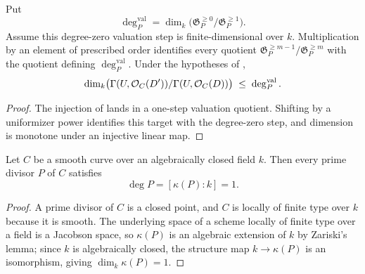 \begin{theorem}
  \label{thm:adelic_local_step_dim_le_residue_degree}
  \leanok
  Put
  \[
    \deg_P^{\mathrm{val}}
      =\dim_k\bigl(\mathfrak G_P^{\ge0}/\mathfrak G_P^{\ge1}\bigr).
  \]
  Assume this degree-zero valuation step is finite-dimensional over \(k\).
  Multiplication by an element of prescribed order identifies every
  quotient \(\mathfrak G_P^{\ge m-1}/\mathfrak G_P^{\ge m}\) with the
  quotient defining \(\deg_P^{\mathrm{val}}\).  Under the hypotheses of
  ,
  \[
    \dim_k \bigl(\Gamma(U, \mathcal{O}_{C}(D'))/\Gamma(U, \mathcal{O}_{C}(D))\bigr)
      \;\le\; \deg_P^{\mathrm{val}}.
  \]
\end{theorem}
\begin{proof}
  \leanok
  The injection of  lands in a
  one-step valuation quotient.  Shifting by a uniformizer power identifies
  this target with the degree-zero step, and dimension is monotone under
  an injective linear map.
\end{proof}

\begin{theorem}
  \label{thm:adelic_residue_degree_one}
  \leanok
  Let \(C\) be a smooth curve over an algebraically closed field \(k\). Then
  every prime divisor \(P\) of \(C\) satisfies
  \[
    \deg P = [\kappa(P):k] = 1 .
  \]
\end{theorem}
\begin{proof}
  \leanok
  A prime divisor of \(C\) is a closed point, and \(C\) is locally of finite
  type over \(k\) because it is smooth. The underlying space of a scheme
  locally of finite type over a field is a Jacobson space, so
  \(\kappa(P)\) is an algebraic extension of \(k\) by Zariski's lemma; since
  \(k\) is algebraically closed, the structure map \(k \to \kappa(P)\) is an
  isomorphism, giving \(\dim_k \kappa(P) = 1\).
\end{proof}


